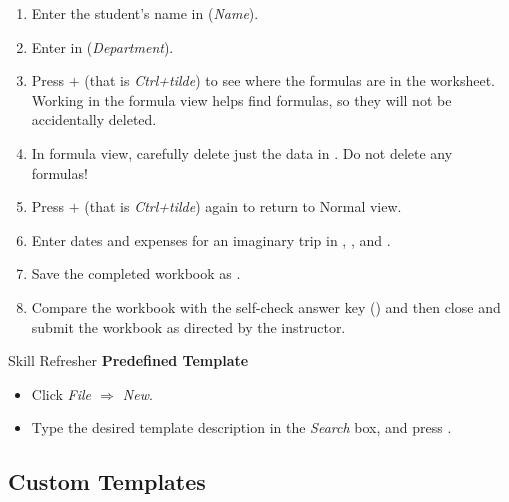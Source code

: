 \begin{enumbox}
	\begin{enumerate}
		\item Enter the student's name in  (\textit{Name}).
		\item Enter  in  (\textit{Department}).
		\item Press $+$\fmtKeystroke{$ \sim $} (that is \textit{Ctrl+tilde}) to see where the formulas are in the worksheet. Working in the formula view helps find formulas, so they will not be accidentally deleted.
		\item In formula view, carefully delete just the data in . Do not delete any formulas!
		\item Press $+$\fmtKeystroke{$ \sim $} (that is \textit{Ctrl+tilde}) again to return to Normal view.
		\item Enter dates and expenses for an imaginary trip in , , and .
		\item Save the completed workbook as .
		\item Compare the workbook with the self-check answer key () and then close and submit the  workbook as directed by the instructor.
	\end{enumerate}
\end{enumbox}

\begin{center}
	\begin{sklbox}{Skill Refresher}
		\textbf{Predefined Template}
		\\
		\begin{itemize}
			\setlength{\itemsep}{0pt}
			\setlength{\parskip}{0pt}
			\setlength{\parsep}{0pt}

			\item Click \textit{File $ \Rightarrow $ New}.
			\item Type the desired template description in the \textit{Search} box, and press .
			
		\end{itemize}
	\end{sklbox}
\end{center}

\subsection{Custom Templates}

